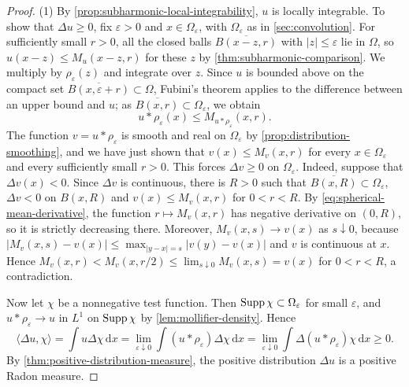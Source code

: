 \begin{proof}
(1) By \cref{prop:subharmonic-local-integrability}, $u$ is locally integrable. To show that $\Delta u\geq0$, fix $\varepsilon>0$ and $x\in\Omega_\varepsilon$, with $\Omega_\varepsilon$ as in \cref{sec:convolution}. For sufficiently small $r>0$, all the closed balls $\overline{B(x-z,r)}$ with $|z|\leq\varepsilon$ lie in $\Omega$, so $u(x-z)\leq M_u(x-z,r)$ for these $z$ by \cref{thm:subharmonic-comparison}. We multiply by $\rho_\varepsilon(z)$ and integrate over $z$. Since $u$ is bounded above on the compact set $\overline{B(x,\varepsilon+r)}\subset\Omega$, Fubini's theorem applies to the difference between an upper bound and $u$; as $\overline{B(x,r)}\subset\Omega_\varepsilon$, we obtain
\[
 u*\rho_\varepsilon(x)\leq M_{u*\rho_\varepsilon}(x,r).
\]
The function $v=u*\rho_\varepsilon$ is smooth and real on $\Omega_\varepsilon$ by \cref{prop:distribution-smoothing}, and we have just shown that $v(x)\leq M_v(x,r)$ for every $x\in\Omega_\varepsilon$ and every sufficiently small $r>0$. This forces $\Delta v\geq0$ on $\Omega_\varepsilon$. Indeed, suppose that $\Delta v(x)<0$. Since $\Delta v$ is continuous, there is $R>0$ such that $\overline{B(x,R)}\subset\Omega_\varepsilon$, $\Delta v<0$ on $B(x,R)$ and $v(x)\leq M_v(x,r)$ for $0<r<R$. By \eqref{eq:spherical-mean-derivative}, the function $r\mapsto M_v(x,r)$ has negative derivative on $(0,R)$, so it is strictly decreasing there. Moreover, $M_v(x,s)\to v(x)$ as $s\downarrow0$, because $|M_v(x,s)-v(x)|\leq\max_{|y-x|=s}|v(y)-v(x)|$ and $v$ is continuous at $x$. Hence $M_v(x,r)<M_v(x,r/2)\leq\lim_{s\downarrow0}M_v(x,s)=v(x)$ for $0<r<R$, a contradiction.

Now let $\chi$ be a nonnegative test function. Then $\operatorname{Supp}\chi\subset\Omega_\varepsilon$ for small $\varepsilon$, and $u*\rho_\varepsilon\to u$ in $L^1$ on $\operatorname{Supp}\chi$ by \cref{lem:mollifier-density}. Hence
\[
 \langle\Delta u,\chi\rangle=\int u\Delta\chi\,\mathrm d x=\lim_{\varepsilon\downarrow0}\int(u*\rho_\varepsilon)\Delta\chi\,\mathrm d x=\lim_{\varepsilon\downarrow0}\int\Delta(u*\rho_\varepsilon)\chi\,\mathrm d x\geq0.
\]
By \cref{thm:positive-distribution-measure}, the positive distribution $\Delta u$ is a positive Radon measure.


\end{proof}
